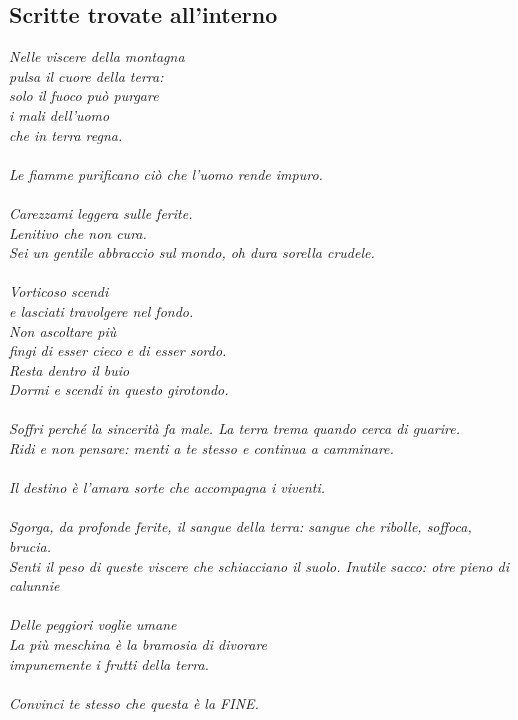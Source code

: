 \subsection{Scritte trovate all'interno}
\textit{
  Nelle viscere della montagna\\
  pulsa il cuore della terra:\\
  solo il fuoco pu\`o purgare\\
  i mali dell'uomo\\
  che in terra regna.\\
  \\
  Le fiamme purificano ci\`o che l'uomo rende impuro.\\
  \\
  Carezzami leggera sulle ferite.\\
  Lenitivo che non cura.\\
  Sei un gentile abbraccio sul mondo, oh dura sorella crudele.\\
  \\
  Vorticoso scendi\\
  e lasciati travolgere nel fondo.\\
  Non ascoltare più\\
  fingi di esser cieco e di esser sordo.\\
  Resta dentro il buio\\
  Dormi e scendi in questo girotondo.\\
  \\
  Soffri perché la sincerità fa male. La terra trema quando cerca di guarire.\\
  Ridi e non pensare: menti a te stesso e continua a camminare.\\
  \\
  Il destino è l'amara sorte che accompagna i viventi.\\
  \\
  Sgorga, da profonde ferite, il sangue della terra: sangue che ribolle, soffoca, brucia.\\
  Senti il peso di queste viscere che schiacciano il suolo. Inutile sacco: otre pieno di calunnie\\
  \\
  Delle peggiori voglie umane\\
  La più meschina è la bramosia di divorare\\
  impunemente i frutti della terra.\\
  \\
  Convinci te stesso che questa è la FINE.\\
}
